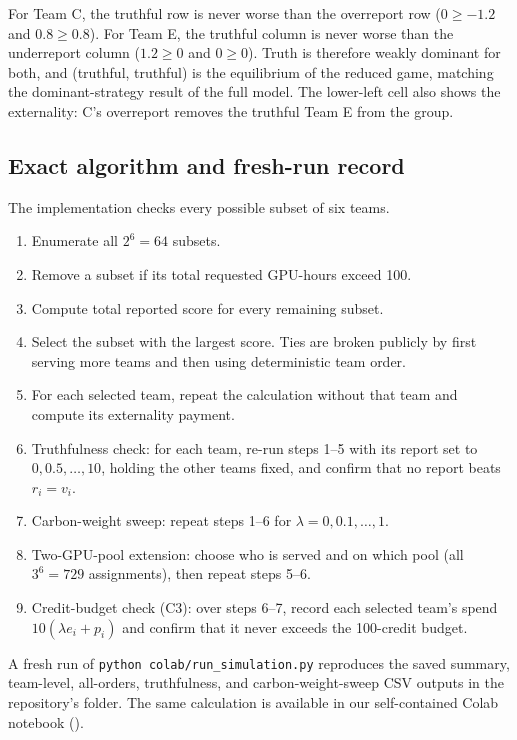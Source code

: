 For Team C, the truthful row is never worse than the overreport row ($0\ge-1.2$ and $0.8\ge0.8$). For Team E, the truthful column is never worse than the underreport column ($1.2\ge0$ and $0\ge0$). Truth is therefore weakly dominant for both, and (truthful, truthful) is the equilibrium of the reduced game, matching the dominant-strategy result of the full model. The lower-left cell also shows the externality: C's overreport removes the truthful Team E from the group.

\subsection{Exact algorithm and fresh-run record}

The implementation checks every possible subset of six teams.

\begin{enumerate}
\item Enumerate all $2^6=64$ subsets.
\item Remove a subset if its total requested GPU-hours exceed 100.
\item Compute total reported score for every remaining subset.
\item Select the subset with the largest score. Ties are broken publicly by first serving more teams and then using deterministic team order.
\item For each selected team, repeat the calculation without that team and compute its externality payment.
\item Truthfulness check: for each team, re-run steps 1--5 with its report set to $0,0.5,\dots,10$, holding the other teams fixed, and confirm that no report beats $r_i=v_i$.
\item Carbon-weight sweep: repeat steps 1--6 for $\lambda=0,0.1,\dots,1$.
\item Two-GPU-pool extension: choose who is served and on which pool (all $3^6=729$ assignments), then repeat steps 5--6.
\item Credit-budget check (C3): over steps 6--7, record each selected team's spend $10(\lambda e_i+p_i)$ and confirm that it never exceeds the 100-credit budget.
\end{enumerate}

A fresh run of \texttt{python colab/run\_simulation.py} reproduces the saved summary, team-level, all-orders, truthfulness, and carbon-weight-sweep CSV outputs in the repository's  folder. The same calculation is available in our self-contained Colab notebook (\NotebookLink).

